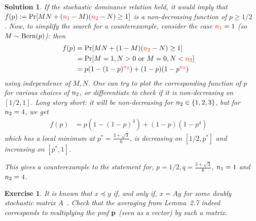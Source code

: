 \documentclass[biber,plain]{nowfnt} %
\newtheorem{question}{Exercise}[chapter]
\newtheorem{solution}{Solution}[chapter]
\newcommand{\nss}{\textcolor{red}{\ns_1}}
\newcommand{\nst}{\textcolor{red}{\ns_2}}
\newcommand{\nss}{\ns_1}
\newcommand{\nst}{\ns_2}
\begin{document}
\begin{solution}
If the stochastic dominance relation held, it would imply that $f(p) \eqdef \bPr{MN+(\nss-M)(\nst-N)\geq 1}$ is a non-decreasing function of $p\geq 1/2$. Now, to simplify the search for a counterexample, consider the case $\nss=1$ (so $M\sim\operatorname{Bern}( p ) $): then
\begin{align*}
	f(p) 
	&= \bPr{MN+(1-M)(\nst-N)\geq 1} \\
	&= \bPr{M = 1, N > 0 \text{ or } M=0, N < \nst } \\
	&= p(1-(1-p)^{\nst}) + (1-p)(1-p^{\nst})
\end{align*}
using independence of $M,N$. One can try to plot the corresponding function of $p$ for various choices of $n_2$, or differentiate to check if it is non-decreasing on $[1/2,1]$. Long story short: it will be non-decreasing for $n_2\in\{1,2,3\}$, but for $n_2=4$, we get
\begin{align*}
	f(p) &= p(1-(1-p)^4) + (1-p)(1-p^4)
\end{align*}
which has a local minimum at $p^\ast=\frac{3+\sqrt{3}}{6}$, is decreasing on $[1/2, p^\ast]$ and increasing on $[p^\ast, 1]$. 


This gives a counterexample to the statement for, \eg $p=1/2, q=\frac{3+\sqrt{3}}{6}$, $n_1=1$ and $n_2=4$.
\end{solution}
\begin{question}\label{ex:identity:averaging:stochastic} 
    It is known that $x\preceq y$ if, and only if, $x=Ay$ for some doubly stochastic matrix $A$~\citep[Theorem~2.1]{Arnold87}. Check that the averaging from Lemma~2.7 indeed corresponds to multiplying the pmf $\mathbf{p}$ (seen as a vector) by such a matrix.
\end{question}
\end{document}
